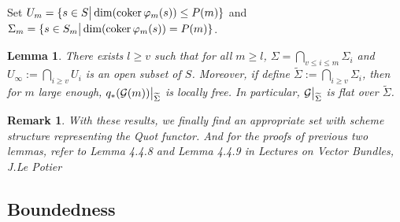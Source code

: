 \documentclass{ctexart}
\newtheorem{remark}{Remark}[section]
\newtheorem{lemma}{Lemma}[section]
\newcommand{\coker}{\operatorname{coker}}
\begin{document}
Set $U_{m} = \{s\in S \big{|} \dim (\coker \varphi_{m}(s)) \le P(m)\}$ and $\Sigma_{m} = \{s\in S_{m} \big{|} \dim (\coker \varphi_{m}(s)) = P(m)\}$.
\begin{lemma}
    There exists $l \ge v$ such that for all $m \ge l$, $\Sigma = \bigcap_{v \le i \le m} \Sigma_{i}$ and $U_{\infty} := \bigcap_{i \ge v} U_{i}$ is an open subset of $S$.
    Moreover, if define $\widetilde{\Sigma} := \bigcap_{i \ge v} \Sigma_{i}$,
    then for $m$ large enough, $q_{\ast}(\mathcal{G}(m))\big{|}_{\widetilde{\Sigma}}$ is locally free.
    In particular, $\mathcal{G}\big{|}_{\widetilde{\Sigma}}$ is flat over $\widetilde{\Sigma}$.
    \label{Lemma 7.12}
\end{lemma}
\begin{remark}
    With these results, we finally find an appropriate set with scheme structure representing the Quot functor.
    And for the proofs of previous two lemmas, refer to Lemma 4.4.8 and Lemma 4.4.9 in \emph{Lectures on Vector Bundles}, J.Le Potier
\end{remark}

\subsection{Boundedness}
\label{subsection:Moduli_Space_of_Vector_Bundles_Boundedness}
\end{document}

